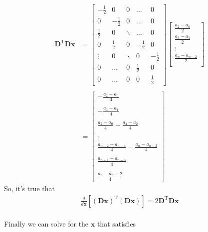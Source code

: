 \documentclass{article}
\newcommand{\x}{\mathbf{x}}
\newcommand{\D}{\mathbf{D}}
\begin{document}
\begin{align*}
\D^{\textrm{T}}\D\x &= 
\begin{bmatrix}
  -\frac{1}{2} & 0  & 0 & \dots & 0\\
  0 & -\frac{1}{2} & 0  & \dots & 0 \\
  \frac{1}{2} & 0 & \ddots   & \dots & 0 \\
  0 & \frac{1}{2} & 0  & -\frac{1}{2}  & 0\\
  \vdots & 0 & \ddots & 0& -\frac{1}{2} \\
  0 & \dots & 0 & \frac{1}{2} & 0 \\
  0 & \dots & 0 & 0 & \frac{1}{2}
\end{bmatrix}
\begin{bmatrix}
\frac{a_2 - a_0}{2} \\
\frac{a_3 - a_1}{2} \\
\vdots \\
\frac{a_n - a_{n-2}}{2} \\
\end{bmatrix} \\ \\
&= 
\begin{bmatrix}
-\frac{a_2 - a_0}{4} \\\\
-\frac{a_3 - a_1}{4} \\\\
\frac{a_2 - a_0}{4} - \frac{a_4 - a_2}{4} \\\\
\vdots \\
\frac{a_{n-2} - a_{n-4}}{4} - \frac{a_n - a_{n-2}}{4}\\\\
\frac{a_{n-1} - a_{n-3}}{4} \\\\
\frac{a_n - a_n-2}{4}
\end{bmatrix}
\end{align*}
So, it's true that 
\begin{align*}
\frac{d}{d\x} \left[ (\D\x)^{\textrm{T}}(\D\x) \right] = 2\D^{\textrm{T}}\D\x\\
\end{align*}

Finally we can solve for the $\x$ that satisfies
\end{document}
